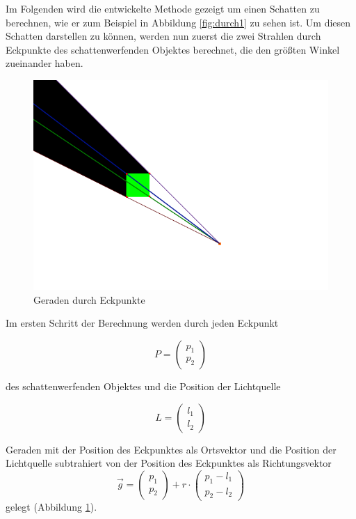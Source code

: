 Im Folgenden wird die entwickelte Methode gezeigt um einen Schatten zu berechnen, wie er zum
Beispiel in Abbildung \ref{fig:durch1} zu sehen ist. Um diesen Schatten darstellen zu können,
werden nun zuerst die zwei Strahlen durch Eckpunkte des schattenwerfenden Objektes berechnet,
die den größten Winkel zueinander haben.

\begin{figure}[t]
	\centering
	\includegraphics[width=\columnwidth]{images/durchfuehrung_1.png}
	\caption{Geraden durch Eckpunkte}
	\label{fig:durch2}
\end{figure}

Im ersten Schritt der Berechnung werden durch jeden Eckpunkt

\begin{equation}
	P = \begin{pmatrix} p_1 \\ p_2 \end{pmatrix}
\end{equation}

des schattenwerfenden Objektes und die Position der Lichtquelle

\begin{equation}
	L = \begin{pmatrix}  l_1 \\ l_2 \end{pmatrix}
\end{equation}

Geraden mit der Position des Eckpunktes als Ortsvektor und die Position der Lichtquelle subtrahiert
von der Position des Eckpunktes als Richtungsvektor
\begin{equation}
	\vec{g} = \begin{pmatrix} p_1 \\ p_2 \end{pmatrix} + r \cdot \begin{pmatrix} p_1 - l_1 \\ p_2 - l_2 \end{pmatrix}
\end{equation}
gelegt (Abbildung \ref{fig:durch2}).

